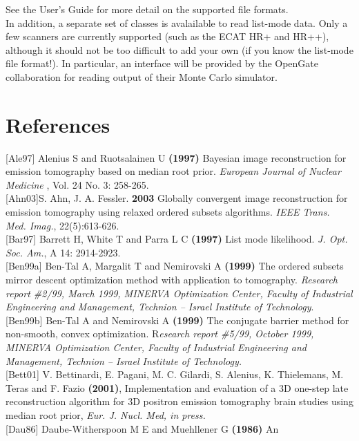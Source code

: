 \documentclass{article}
\begin{document}
See the User's Guide for more detail on the supported file formats.\\
In addition, a separate set of classes is avalailable
to read list-mode 
data. Only a few scanners are currently supported (such as the 
ECAT HR+ and HR++), although it should not be too difficult to 
add your own (if you know the list-mode file format!). In particular, 
an interface will be provided by the OpenGate collaboration for 
reading output of their Monte Carlo simulator.



\section{
References}

{[}Ale97{]} Alenius S and Ruotsalainen U \textbf{(1997)} Bayesian image 
reconstruction for emission tomography based on median root prior. \textit{European 
Journal of Nuclear Medicine} , Vol. 24 No. 3: 258-265.\\
{[}Ahn03{]}S. Ahn, J. A. Fessler. \textbf{2003}
Globally convergent image reconstruction for emission tomography using relaxed ordered subsets algorithms. 
\textit{IEEE Trans. Med. Imag.}, 22(5):613-626. \\
{[}Bar97{]} Barrett H, White T and Parra L C \textbf{(1997)} List mode 
likelihood. \textit{J. Opt. Soc. Am.}, A 14: 2914-2923.\\
{[}Ben99a{]} Ben-Tal A, Margalit T and Nemirovski A \textbf{(1999)} The 
ordered subsets mirror descent optimization method with application 
to tomography. \textit{Research report \#2/99, March 1999, MINERVA 
Optimization Center, Faculty of Industrial Engineering and Management, 
Technion -- Israel Institute of Technology}.\\
{[}Ben99b{]} Ben-Tal A and Nemirovski A \textbf{(1999)} The conjugate 
barrier method for non-smooth, convex optimization. R\textit{esearch 
report \#5/99, October 1999, MINERVA Optimization Center, Faculty 
of Industrial Engineering and Management, Technion -- Israel Institute 
of Technology.}\\
{[}Bett01{]} V. Bettinardi, E. Pagani, M. C. Gilardi, S. Alenius, 
K. Thielemans, M. Teras and F. Fazio \textbf{(2001)}, Implementation 
and evaluation of a 3D one-step late reconstruction algorithm 
for 3D positron emission tomography brain studies using median 
root prior, \textit{Eur. J. Nucl. Med, in press.}\\
{[}Dau86{]} Daube-Witherspoon M E and Muehllener G \textbf{(1986)} An 
\end{document}
